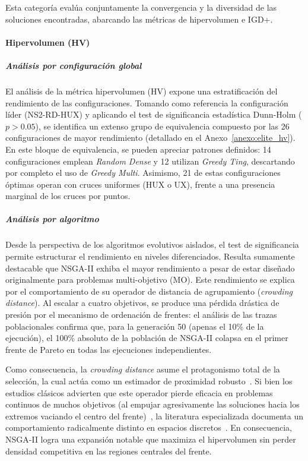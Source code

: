 Esta categoría evalúa conjuntamente la convergencia y la diversidad de las soluciones encontradas, abarcando las métricas de hipervolumen e IGD+.

\paragraph{Hipervolumen (HV)}

\subparagraph{Análisis por configuración global}

El análisis de la métrica hipervolumen (HV) expone una estratificación del rendimiento de las configuraciones. Tomando como referencia la configuración líder (NS2-RD-HUX) y aplicando el test de significancia estadística Dunn-Holm ($p > 0.05$), se identifica un extenso grupo de equivalencia compuesto por las 26 configuraciones de mayor rendimiento (detallado en el Anexo~\ref{anexo:elite_hv}). En este bloque de equivalencia, se pueden apreciar patrones definidos: 14 configuraciones emplean \textit{Random Dense} y 12 utilizan \textit{Greedy Ting}, descartando por completo el uso de \textit{Greedy Multi}. Asimismo, 21 de estas configuraciones óptimas operan con cruces uniformes (HUX o UX), frente a una presencia marginal de los cruces por puntos.

\subparagraph{Análisis por algoritmo}

Desde la perspectiva de los algoritmos evolutivos aislados, el test de significancia permite estructurar el rendimiento en niveles diferenciados. Resulta sumamente destacable que NSGA-II exhiba el mayor rendimiento a pesar de estar diseñado originalmente para problemas multi-objetivo (MO). Este rendimiento se explica por el comportamiento de su operador de distancia de agrupamiento (\textit{crowding distance}). Al escalar a cuatro objetivos, se produce una pérdida drástica de presión por el mecanismo de ordenación de frentes: el análisis de las trazas poblacionales confirma que, para la generación 50 (apenas el 10\% de la ejecución), el 100\% absoluto de la población de NSGA-II colapsa en el primer frente de Pareto en todas las ejecuciones independientes.

Como consecuencia, la \textit{crowding distance} asume el protagonismo total de la selección, la cual actúa como un estimador de proximidad robusto~\cite{ishibuchi2015behavior}. Si bien los estudios clásicos advierten que este operador pierde eficacia en problemas continuos de muchos objetivos (al empujar agresivamente las soluciones hacia los extremos vaciando el centro del frente)~\cite{purshouse2003evolutionary, ishibuchi2008evolutionary, deb2013evolutionary}, la literatura especializada documenta un comportamiento radicalmente distinto en espacios discretos~\cite{ishibuchi2008performance, ishibuchi2015behavior}. En consecuencia, NSGA-II logra una expansión notable que maximiza el hipervolumen sin perder densidad competitiva en las regiones centrales del frente.

